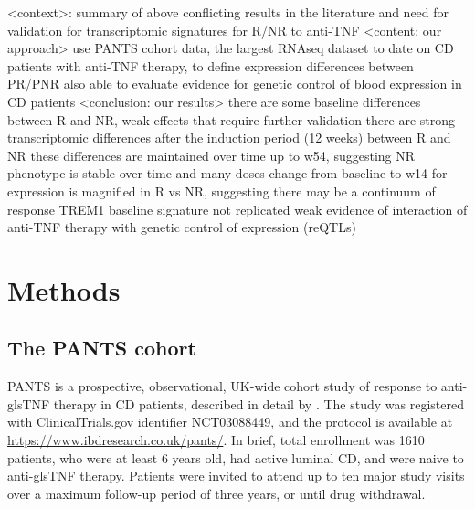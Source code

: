 \begin{outline}
\1 <context>: summary of above
    \2 conflicting results in the literature and need for validation for transcriptomic signatures for R/NR to anti-TNF 
\1 <content: our approach> 
    \2 use PANTS cohort data, the largest RNAseq dataset to date on CD patients with anti-TNF therapy, to define expression differences between PR/PNR
    \2 also able to evaluate evidence for genetic control of blood expression in CD patients
\1 <conclusion: our results> 
    \2 there are some baseline differences between R and NR, weak effects that require further validation
    \2 there are strong transcriptomic differences after the induction period (12 weeks) between R and NR
    \2 these differences are maintained over time up to w54, suggesting NR phenotype is stable over time and many doses
    \2 change from baseline to w14 for expression is magnified in R vs NR, suggesting there may be a continuum of response
    \2 TREM1 baseline signature not replicated
    \2 weak evidence of interaction of anti-TNF therapy with genetic control of expression (reQTLs)

\section{Methods}

\subsection{The PANTS cohort}

\gls{PANTS} is a prospective, observational, UK-wide cohort study of response to anti-gls{TNF} therapy in \gls{CD} patients, described in detail by \textcite{kennedy2019PredictorsAntiTNFTreatment}.
The study was registered with ClinicalTrials.gov identifier NCT03088449, and the protocol is available at \url{https://www.ibdresearch.co.uk/pants/}.
In brief, total enrollment was 1610 patients, who were at least 6 years old, had active luminal \gls{CD}, and were naive to anti-gls{TNF} therapy.
Patients were invited to attend up to ten major study visits over a maximum follow-up period of three years, or until drug withdrawal.


\end{outline}

